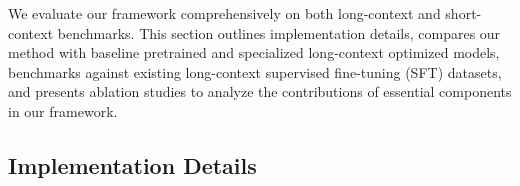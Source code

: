 We evaluate our framework comprehensively on both long-context and short-context benchmarks. This section outlines implementation details, compares our method with baseline pretrained and specialized long-context optimized models, benchmarks against existing long-context supervised fine-tuning (SFT) datasets, and presents ablation studies to analyze the contributions of essential components in our framework.

\subsection{Implementation Details}

